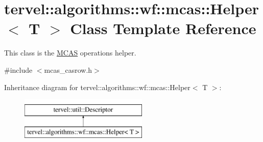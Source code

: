 \hypertarget{classtervel_1_1algorithms_1_1wf_1_1mcas_1_1_helper}{}\section{tervel\+:\+:algorithms\+:\+:wf\+:\+:mcas\+:\+:Helper$<$ T $>$ Class Template Reference}
\label{classtervel_1_1algorithms_1_1wf_1_1mcas_1_1_helper}


This class is the \hyperlink{classtervel_1_1algorithms_1_1wf_1_1mcas_1_1_m_c_a_s}{M\+C\+A\+S} operation\textquotesingle{}s helper.  




{\ttfamily \#include $<$mcas\+\_\+casrow.\+h$>$}

Inheritance diagram for tervel\+:\+:algorithms\+:\+:wf\+:\+:mcas\+:\+:Helper$<$ T $>$\+:\begin{figure}[H]
\begin{center}
\leavevmode
\includegraphics[height=2.000000cm]{classtervel_1_1algorithms_1_1wf_1_1mcas_1_1_helper}
\end{center}
\end{figure}
